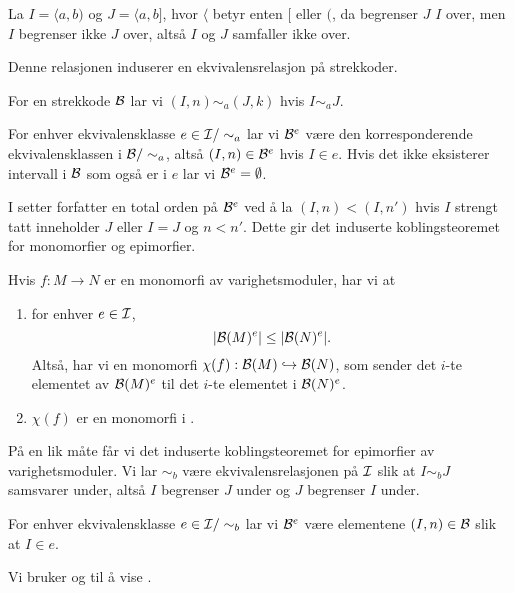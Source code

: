 \begin{bemerk}
  La $I = \langle a,b)$ og $J = \langle a,b]$, hvor
  $\langle$ betyr enten $[$ eller $($, da
  begrenser $J$ $I$ over, men $I$ begrenser ikke $J$ over,
  altså $I$ og $J$ samfaller ikke over.
\end{bemerk}

Denne relasjonen induserer en ekvivalensrelasjon på
strekkoder.

\begin{definisjon}\label{def:EkRelBarc}
  For en strekkode $\mathcal{B}$ lar vi $(I,n)\sim_a (J,k)$ hvis
  $I\sim_a J$.
\end{definisjon}

For enhver ekvivalensklasse $e\in\mathcal{I}/\sim_a$ lar vi
$\mathcal{B}^e$ være den korresponderende ekvivalensklassen
i $\mathcal{B}/\sim_a$, altså $(I,n)\in\mathcal{B}^e$ hvis $I\in e$.
Hvis det ikke eksisterer intervall i $\mathcal{B}$ som også er
i $e$ lar vi $\mathcal{B}^e=\emptyset$.

I \citep[seksjon 3.2]{Bauer2020} setter forfatter en total orden
på $\mathcal{B}^e$ ved å la $(I,n) < (I,n')$ hvis $I$ strengt tatt
inneholder $J$ eller $I=J$ og $n<n'$. Dette gir det induserte
koblingsteoremet for monomorfier og epimorfier.

\begin{proposisjon}
Hvis $f:M\to N$ er en monomorfi av varighetsmoduler, har vi at
\begin{enumerate}
  \item for enhver $e\in\mathcal{I}$,
    \[|\mathcal{B}(M)^e|\leq|\mathcal{B}(N)^e|.\]
    Altså, har vi en monomorfi $\chi(f):\mathcal{B}(M)\hookrightarrow\mathcal{B}(N)$,
    som sender det $i$-te elementet av $\mathcal{B}(M)^e$ til det $i$-te
    elementet i $\mathcal{B}(N)^e$.
  \item $\chi(f)$ er en monomorfi i \Barc.
\end{enumerate}
\end{proposisjon}

På en lik måte får vi det induserte koblingsteoremet for
epimorfier av varighetsmoduler. Vi lar $\sim_b$ være
ekvivalensrelasjonen på $\mathcal{I}$ slik at $I\sim_b J$
samsvarer under, altså $I$ begrenser $J$ under og $J$
begrenser $I$ under. 

For enhver ekvivalensklasse
$e\in\mathcal{I}/\sim_b$ lar vi $\mathcal{B}^e$ være elementene
$(I,n)\in\mathcal{B}$ slik at $I\in e$.


Vi bruker \citep[lemma 3.4]{Bauer2020} og \citep[lemma
3.5]{Bauer2020} til å vise
.

